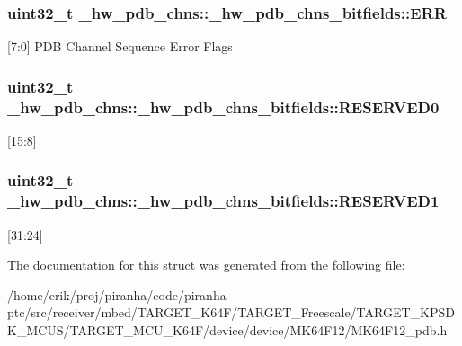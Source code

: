 \subsubsection[{\texorpdfstring{E\+RR}{ERR}}]{\setlength{\rightskip}{0pt plus 5cm}uint32\+\_\+t \+\_\+hw\+\_\+pdb\+\_\+chns\+::\+\_\+hw\+\_\+pdb\+\_\+chns\+\_\+bitfields\+::\+E\+RR}\hypertarget{struct__hw__pdb__chns_1_1__hw__pdb__chns__bitfields_af58d63b81b15b1054b0d1ab4d6eebd6f}{}\label{struct__hw__pdb__chns_1_1__hw__pdb__chns__bitfields_af58d63b81b15b1054b0d1ab4d6eebd6f}
\mbox{[}7\+:0\mbox{]} P\+DB Channel Sequence Error Flags 
\subsubsection[{\texorpdfstring{R\+E\+S\+E\+R\+V\+E\+D0}{RESERVED0}}]{\setlength{\rightskip}{0pt plus 5cm}uint32\+\_\+t \+\_\+hw\+\_\+pdb\+\_\+chns\+::\+\_\+hw\+\_\+pdb\+\_\+chns\+\_\+bitfields\+::\+R\+E\+S\+E\+R\+V\+E\+D0}\hypertarget{struct__hw__pdb__chns_1_1__hw__pdb__chns__bitfields_ab502d91b5c3f4de3b4ad9451afb6cdad}{}\label{struct__hw__pdb__chns_1_1__hw__pdb__chns__bitfields_ab502d91b5c3f4de3b4ad9451afb6cdad}
\mbox{[}15\+:8\mbox{]} 
\subsubsection[{\texorpdfstring{R\+E\+S\+E\+R\+V\+E\+D1}{RESERVED1}}]{\setlength{\rightskip}{0pt plus 5cm}uint32\+\_\+t \+\_\+hw\+\_\+pdb\+\_\+chns\+::\+\_\+hw\+\_\+pdb\+\_\+chns\+\_\+bitfields\+::\+R\+E\+S\+E\+R\+V\+E\+D1}\hypertarget{struct__hw__pdb__chns_1_1__hw__pdb__chns__bitfields_af24e37c6931bdc4360eff858268e1a9c}{}\label{struct__hw__pdb__chns_1_1__hw__pdb__chns__bitfields_af24e37c6931bdc4360eff858268e1a9c}
\mbox{[}31\+:24\mbox{]} 

The documentation for this struct was generated from the following file\+:\begin{DoxyCompactItemize}
\item 
/home/erik/proj/piranha/code/piranha-\/ptc/src/receiver/mbed/\+T\+A\+R\+G\+E\+T\+\_\+\+K64\+F/\+T\+A\+R\+G\+E\+T\+\_\+\+Freescale/\+T\+A\+R\+G\+E\+T\+\_\+\+K\+P\+S\+D\+K\+\_\+\+M\+C\+U\+S/\+T\+A\+R\+G\+E\+T\+\_\+\+M\+C\+U\+\_\+\+K64\+F/device/device/\+M\+K64\+F12/M\+K64\+F12\+\_\+pdb.\+h\end{DoxyCompactItemize}
